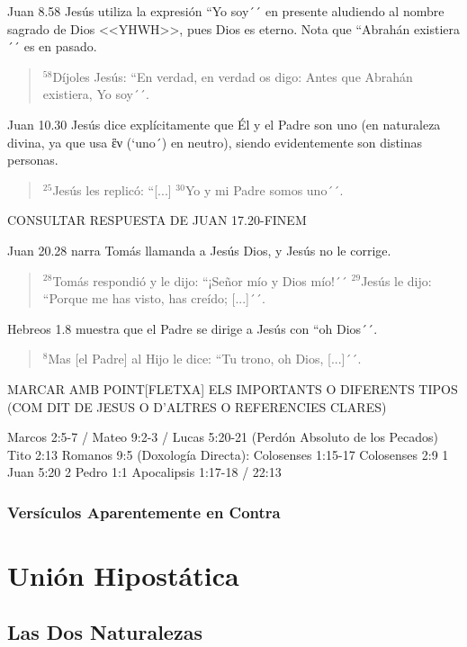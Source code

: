 \documentclass[12pt]{report}
\begin{document}
	\point Juan 8.58 Jesús utiliza la expresión ``Yo soy´´ en presente aludiendo al nombre sagrado de Dios <<YHWH>>, pues Dios es eterno. Nota que ``Abrahán existiera´´ es en pasado.
	\begin{quote}
		$^{58}$Díjoles Jesús: ``En verdad, en verdad os digo: Antes que Abrahán existiera, Yo soy´´.
	\end{quote}
	
	\point Juan 10.30 Jesús dice explícitamente que Él y el Padre son uno (en naturaleza divina, ya que usa \textgreek{ἓν} (`uno´) en neutro), siendo evidentemente son distinas personas.
	\begin{quote}
		$^{25}$Jesús les replicó: ``[...] $^{30}$Yo y mi Padre somos uno´´.
	\end{quote}
	CONSULTAR RESPUESTA DE JUAN 17.20-FINEM
	
	\point Juan 20.28 narra Tomás llamanda a Jesús Dios, y Jesús no le corrige.
	\begin{quote}
		$^{28}$Tomás respondió y le dijo: ``¡Señor mío y Dios mío!´´ $^{29}$Jesús le dijo: ``Porque me has visto, has creído; [...]´´.
	\end{quote}
	
	\point Hebreos 1.8 muestra que el Padre se dirige a Jesús con ``oh Dios´´.
	\begin{quote}
		$^{8}$Mas [el Padre] al Hijo le dice: ``Tu trono, oh Dios, [...]´´.
	\end{quote}
	
	
	MARCAR AMB POINT[FLETXA] ELS IMPORTANTS O DIFERENTS TIPOS (COM DIT DE JESUS O D'ALTRES O REFERENCIES CLARES)
	
	Marcos 2:5-7 / Mateo 9:2-3 / Lucas 5:20-21 (Perdón Absoluto de los Pecados)
	Tito 2:13
	Romanos 9:5 (Doxología Directa):
	Colosenses 1:15-17
	Colosenses 2:9
	1 Juan 5:20
	2 Pedro 1:1
	Apocalipsis 1:17-18 / 22:13
	
	
	\subsubsection{Versículos Aparentemente en Contra}
	
	
	
	\section{Unión Hipostática}
	\subsection{Las Dos Naturalezas}
\end{document}
